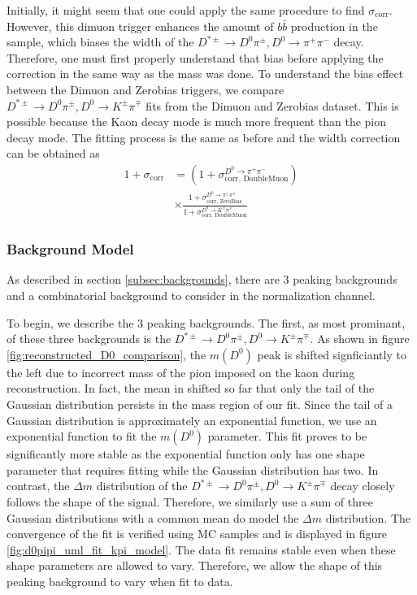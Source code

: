 Initially, it might seem that one could apply the same procedure to find $\sigma_{\text{corr}}$. However, this dimuon trigger enhances the amount of $b\bar{b}$ production in the sample, which biases the width of the $D^{*\pm}\to D^0 \pi^\pm, D^0 \to \pi^+ \pi^-$ decay. Therefore, one must first properly understand that bias before applying the correction in the same way as the mass was done. To understand the bias effect between the Dimuon and Zerobias triggers, we compare $D^{*\pm}\to D^0 \pi^\pm, D^0 \to K^\pm \pi^\mp$ fits from the Dimuon and Zerobias dataset. This is possible because the Kaon decay mode is much more frequent than the pion decay mode. The fitting process is the same as before and the width correction 
can be obtained as
\begin{equation}
    \begin{split}
        1+\sigma_{\text{corr}} &= \left(1+\sigma_{\text{corr, DoubleMuon}}^{D^0\to\pi^+\pi^-}\right) \\
        &\times \frac{
            1+\sigma_{\text{corr, ZeroBias}}^{D^0\to\pi^\pm\pi^\mp}
        }{
            1+\sigma_{\text{corr, DoubleMuon}}^{D^0\to K^\pm\pi^\mp}
        }
    \end{split}
\end{equation}    


\subsubsection{Background Model}

As described in section \ref{subsec:backgrounds}, there are 3 peaking backgrounds and a combinatorial background to consider in the normalization channel. 

To begin, we describe the 3 peaking backgrounds. The first, as most prominant, of these three backgrounds is the $D^{*\pm} \to D^0\pi^\pm, D^0 \to K^\pm \pi^\mp$. As shown in figure \ref{fig:reconstructed_D0_comparison}, the $m(D^0)$ peak is shifted signficiantly to the left due to incorrect mass of the pion imposed on the kaon during reconstruction. In fact, the mean in shifted so far that only the tail of the Gaussian distribution persists in the mass region of our fit. Since the tail of a Gaussian distribution is approximately an exponential function, we use an exponential function to fit the $m(D^0)$ parameter. This fit proves to be significantly more stable as the exponential function only has one shape parameter that requires fitting while the Gaussian distribution has two. In contrast, the $\Delta m$ distribution of the $D^{*\pm} \to D^0\pi^\pm, D^0 \to K^\pm \pi^\mp$ decay closely follows the shape of the signal. Therefore, we similarly use a sum of three Gaussian distributions with a common mean do model the $\Delta m$ distribution. The convergence of the fit is verified using MC samples and is displayed in figure \ref{fig:d0pipi_uml_fit_kpi_model}. The data fit remains stable even when these shape parameters are allowed to vary. Therefore, we allow the shape of this peaking background to vary when fit to data. 

